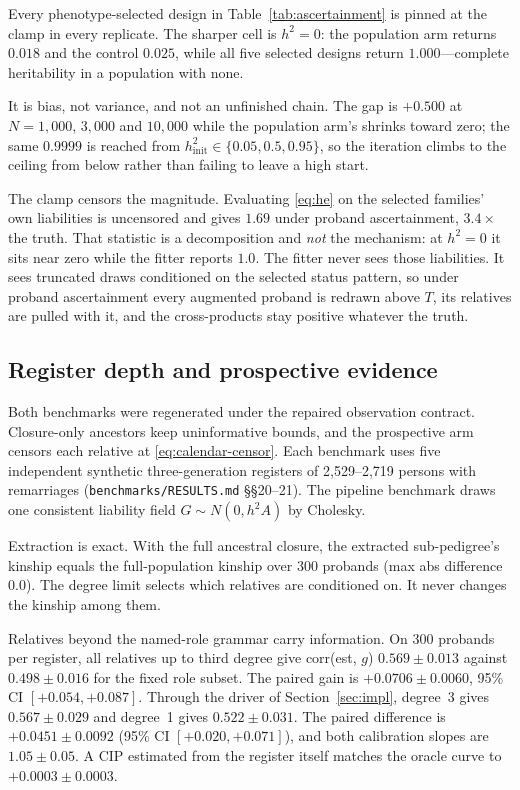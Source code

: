 \documentclass[11pt,a4paper]{article}
\newcommand{\h}{h^{2}}
\begin{document}
Every phenotype-selected design in Table~\ref{tab:ascertainment} is
pinned at the clamp in every replicate.
The sharper cell is $\h=0$: the population arm returns $0.018$ and
the control $0.025$, while all five selected designs return
$1.000$---complete heritability in a population with none.

It is bias, not variance, and not an unfinished chain.
The gap is $+0.500$ at $N=1{,}000$, $3{,}000$ and $10{,}000$ while
the population arm's shrinks toward zero; the same $0.9999$ is
reached from $\h_{\mathrm{init}}\in\{0.05,0.5,0.95\}$, so the
iteration climbs to the ceiling from below rather than failing to
leave a high start.

The clamp censors the magnitude.
Evaluating \eqref{eq:he} on the selected families' own liabilities
is uncensored and gives $1.69$ under proband ascertainment,
$3.4\times$ the truth.
That statistic is a decomposition and \emph{not} the mechanism: at
$\h=0$ it sits near zero while the fitter reports $1.0$.
The fitter never sees those liabilities.
It sees truncated draws conditioned on the selected status pattern,
so under proband ascertainment every augmented proband is redrawn
above $T$, its relatives are pulled with it, and the cross-products
stay positive whatever the truth.

\subsection{Register depth and prospective evidence}

Both benchmarks were regenerated under the repaired observation contract.
Closure-only ancestors keep uninformative bounds, and the prospective
arm censors each relative at \eqref{eq:calendar-censor}.
Each benchmark uses five independent synthetic three-generation
registers of 2{,}529--2{,}719 persons with remarriages
(\texttt{benchmarks/RESULTS.md} \S\S20--21).
The pipeline benchmark draws one consistent liability field
$G\sim N(0,\h A)$ by Cholesky.

Extraction is exact.
With the full ancestral closure, the extracted sub-pedigree's kinship
equals the full-population kinship over 300 probands (max abs
difference $0.0$).
The degree limit selects which relatives are conditioned on.
It never changes the kinship among them.

Relatives beyond the named-role grammar carry information.
On 300 probands per register, all relatives up to third degree give
corr(est, $g$) $0.569\pm 0.013$ against $0.498\pm 0.016$ for the fixed
role subset.
The paired gain is $+0.0706\pm 0.0060$, 95\% CI $[+0.054,+0.087]$.
Through the driver of Section~\ref{sec:impl}, degree~3 gives
$0.567\pm 0.029$ and degree~1 gives $0.522\pm 0.031$.
The paired difference is $+0.0451\pm 0.0092$ (95\% CI
$[+0.020,+0.071]$), and both calibration slopes are $1.05\pm 0.05$.
A CIP estimated from the register itself matches the oracle curve to
$+0.0003\pm 0.0003$.
\end{document}
